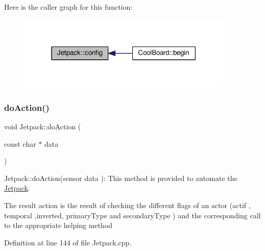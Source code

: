 Here is the caller graph for this function\+:\nopagebreak
\begin{figure}[H]
\begin{center}
\leavevmode
\includegraphics[width=291pt]{df/d1d/class_jetpack_ab065ee83e244265a2223a22f3ee4a719_icgraph}
\end{center}
\end{figure}
\mbox{\label{class_jetpack_a9e703197093094b963f9ad57817495b8}} 
\subsubsection{\texorpdfstring{do\+Action()}{doAction()}}
{\footnotesize\ttfamily void Jetpack\+::do\+Action (\begin{DoxyParamCaption}\item[{const char $\ast$}]{data }\end{DoxyParamCaption})}

Jetpack\+::do\+Action(sensor data )\+: This method is provided to automate the \hyperlink{class_jetpack}{Jetpack}.

The result action is the result of checking the different flags of an actor (actif , temporal ,inverted, primary\+Type and secondary\+Type ) and the corresponding call to the appropriate helping method 

Definition at line 144 of file Jetpack.\+cpp.


